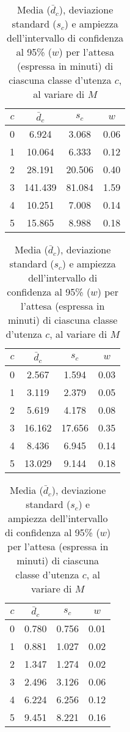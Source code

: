 \begin{table}[ht]
\centering
\begin{subtable}{0.5\textwidth}
\centering
{\tablecolors
\begin{tabular}{|c|c|c|c|}
\hline
$c$ & $\bar{d}_c$ & $s_c$ & $w$\\
\hline
0 & 6.924 & 3.068 & 0.06 \\
\hline
1 & 10.064 & 6.333 & 0.12 \\
\hline
2 & 28.191 & 20.506 & 0.40 \\
\hline
3 & 141.439 & 81.084 & 1.59 \\
\hline
4 & 10.251 & 7.008 & 0.14 \\
\hline
5 & 15.865 & 8.988 & 0.18 \\
\hline
\end{tabular}}
\caption{$M = 2$}
\end{subtable}%
\begin{subtable}{0.5\textwidth}
\centering
{\tablecolors
\begin{tabular}{|c|c|c|c|}
\hline
$c$ & $\bar{d}_c$ & $s_c$ & $w$\\
\hline
0 & 2.567 & 1.594 & 0.03 \\
\hline
1 & 3.119 & 2.379 & 0.05 \\
\hline
2 & 5.619 & 4.178 & 0.08 \\
\hline
3 & {\color{red}16.162} & {\color{red}17.656} & {\color{red}0.35} \\
\hline
4 & 8.436 & 6.945 & 0.14 \\
\hline
5 & 13.029 & 9.144 & 0.18 \\
\hline
\end{tabular}}
\caption{$M = 3$}
\label{table:esperimenti-simulazione-1b}
\end{subtable}
\begin{subtable}{0.5\textwidth}
\centering
{\tablecolors
\begin{tabular}{|c|c|c|c|}
\hline
$c$ & $\bar{d}_c$ & $s_c$ & $w$\\
\hline
0 & 0.780 & 0.756 & 0.01 \\
\hline
1 & 0.881 & 1.027 & 0.02 \\
\hline
2 & 1.347 & 1.274 & 0.02 \\
\hline
3 & 2.496 & 3.126 & 0.06 \\
\hline
4 & 6.224 & 6.256 & 0.12 \\
\hline
5 & 9.451 & 8.221 & 0.16 \\
\hline
\end{tabular}}
\caption{$M = 4$}
\end{subtable}
\caption{Media ($\bar{d}_c$), deviazione standard ($s_c$) e ampiezza dell'intervallo di confidenza al 95\% ($w$) per l'attesa (espressa in minuti) di ciascuna classe d'utenza $c$, al variare di $M$}
\label{table:esperimenti-simulazione-1}
\end{table}

